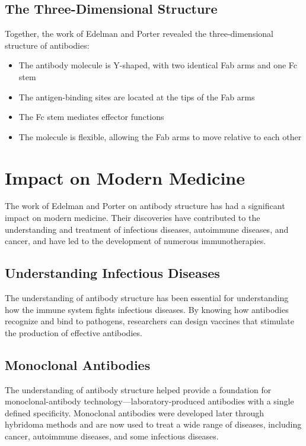 \subsection{The Three-Dimensional Structure}

Together, the work of Edelman and Porter revealed the three-dimensional structure of antibodies:

\begin{itemize}
\item The antibody molecule is Y-shaped, with two identical Fab arms and one Fc stem
\item The antigen-binding sites are located at the tips of the Fab arms
\item The Fc stem mediates effector functions
\item The molecule is flexible, allowing the Fab arms to move relative to each other
\end{itemize}

\section{Impact on Modern Medicine}

The work of Edelman and Porter on antibody structure has had a significant impact on modern medicine. Their discoveries have contributed to the understanding and treatment of infectious diseases, autoimmune diseases, and cancer, and have led to the development of numerous immunotherapies.

\subsection{Understanding Infectious Diseases}

The understanding of antibody structure has been essential for understanding how the immune system fights infectious diseases. By knowing how antibodies recognize and bind to pathogens, researchers can design vaccines that stimulate the production of effective antibodies.

\subsection{Monoclonal Antibodies}

The understanding of antibody structure helped provide a foundation for monoclonal-antibody technology---laboratory-produced antibodies with a single defined specificity. Monoclonal antibodies were developed later through hybridoma methods and are now used to treat a wide range of diseases, including cancer, autoimmune diseases, and some infectious diseases.


